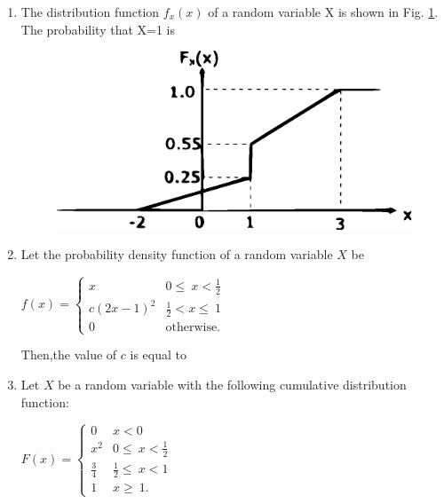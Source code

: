 \begin{enumerate}[label=\thesection.\arabic*.,ref=\thesection.\theenumi]
\item The distribution function $f_x(x)$ of a random variable X is shown in Fig. \ref{fig:12}. The probability that X=1 is
%
\begin{figure}[!h]
\includegraphics[width=\columnwidth]{./figs/figure12.eps}
\caption{}
\label{fig:12}
\end{figure}


\begin{enumerate}
\end{enumerate}
%
\item Let the probability density function of a random variable $X$ be 
\begin{center}
$ 
f(x)=
\begin{cases}
x & 0\leq\ x< \frac{1}{2}\\
c(2x-1)^2 &  \frac{1}{2}<x\leq\ 1\\
0 & \text{otherwise}.
\end{cases}
$\\ 
\end{center}


Then,the value of $c$ is equal to \underline{\hspace{3cm}}
\\
\solution


\item Let $X$ be a random variable with the following cumulative distribution function: 

\begin{center}
$ 
F(x)=
\begin{cases}
0 & x<0 \\
x^2 & 0\leq\ x <\frac{1}{2}\\
\frac{3}{4} & \frac{1}{2}\leq\ x<1\\
1 & x\geq\ 1.
\end{cases}
$\\ 


\end{center}
\end{enumerate}
